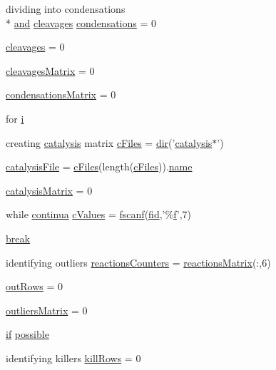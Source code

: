\begin{DoxyCompactItemize}
dividing into condensations \\*
\hyperlink{a00028_a170f8acb213f91bf71c77b1d20bceb33}{and} \hyperlink{a00030_a89060c6979e5a4ff7b0985b35f295695}{cleavages} \hyperlink{a00029_ad3aa27d88a7e9d77d8334155860269bb}{condensations} = 0
\item 
\hyperlink{a00029_a89060c6979e5a4ff7b0985b35f295695}{cleavages} = 0
\item 
\hyperlink{a00029_a1a691fb4f955887edfa538e91479fafe}{cleavages\+Matrix} = 0
\item 
\hyperlink{a00029_afaba8eef2f8f4e4dda2e893a19e55a94}{condensations\+Matrix} = 0
\item 
for \hyperlink{a00029_ac870e1cd47f6d78f16a98a24c8392fcf}{i}
\item 
creating \hyperlink{a00011}{catalysis} matrix \hyperlink{a00029_a9eab57ccb42a39c704f47dc30e4f4515}{c\+Files} = \hyperlink{a00113_a4ca269cf93df1b512b52174c1a256fe5}{dir}('\hyperlink{a00011}{catalysis}$\ast$')
\item 
\hyperlink{a00029_a33e70cf5b45cb59005b82d30202f0b69}{catalysis\+File} = \hyperlink{a00030_a9eab57ccb42a39c704f47dc30e4f4515}{c\+Files}(length(\hyperlink{a00030_a9eab57ccb42a39c704f47dc30e4f4515}{c\+Files})).\hyperlink{a00027_abbf559a76fab59203496b0847ab9502a}{name}
\item 
\hyperlink{a00029_a0810027f58d6be965e44b7b84c44ace8}{catalysis\+Matrix} = 0
\item 
while \hyperlink{a00030_a9c951ebd5bc3f1adce943bee1255f4d6}{continua} \hyperlink{a00029_ad4ba7701967c1da20171228afccb7081}{c\+Values} = \hyperlink{a00025_a028ac102a731e62fb0a7439381f566c1}{fscanf}(\hyperlink{a00031_ae9011d40c6f13e68e6f07156e0da7c5d}{fid},'\%\hyperlink{a00025_a9c5a71c46b1abb8b7df5ebeac6c81535}{f}',7)
\item 
\hyperlink{a00029_a91cf6fbebedd86150a36e5ac3d5d3bfc}{break}
\item 
identifying outliers \hyperlink{a00029_aeea253cb98a56047ef20ceed86e2f0ea}{reactions\+Counters} = \hyperlink{a00030_af998036b749d9fa6dd2365f9937279b6}{reactions\+Matrix}(\+:,6)
\item 
\hyperlink{a00029_a60cfb1ca20cbbc81b85a8f56658b7c99}{out\+Rows} = 0
\item 
\hyperlink{a00029_ad8a18b407726bf44299c9bcf5d1389ff}{outliers\+Matrix} = 0
\item 
\hyperlink{a00030_a01d55766b8058903dd360b4bda71f9f5}{if} \hyperlink{a00029_a07c9e68cdbafe572c04d3112d64deb88}{possible}
\item 
identifying killers \hyperlink{a00029_a747bc1d10158c78e88e314825ed41a13}{kill\+Rows} = 0

\end{DoxyCompactItemize}
